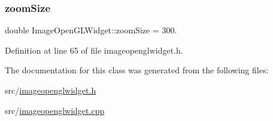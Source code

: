 \subsubsection{\texorpdfstring{zoomSize}{zoomSize}}
{\footnotesize\ttfamily double Image\+Open\+G\+L\+Widget\+::zoom\+Size = 300.\hspace{0.3cm}{\ttfamily [protected]}}



Definition at line 65 of file imageopenglwidget.\+h.



The documentation for this class was generated from the following files\+:\begin{DoxyCompactItemize}
\item 
src/\mbox{\hyperlink{imageopenglwidget_8h}{imageopenglwidget.\+h}}\item 
src/\mbox{\hyperlink{imageopenglwidget_8cpp}{imageopenglwidget.\+cpp}}\end{DoxyCompactItemize}
